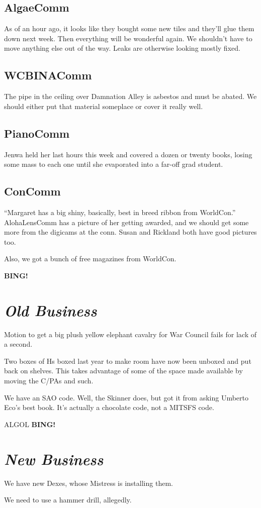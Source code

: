 \documentclass[10pt]{article}
\newcommand{\bing}{{\bf BING!} }
\newcommand{\goto}[1]{\bing \vskip 12pt \section*{{\em{#1}}}}
\begin{document}
\subsection*{AlgaeComm} As of an hour ago, it looks like they bought some new tiles
and they'll glue them down next week.  Then everything will be
wonderful again.  We shouldn't have to move anything else out of the
way.  Leaks are otherwise looking mostly fixed.

\subsection*{WCBINAComm} The pipe in the ceiling over Damnation Alley is asbestos
and must be abated.  We should either put that material someplace or
cover it really well.

\subsection*{PianoComm} Jenwa held her last hours this week and covered a
dozen or twenty books, losing some mass to each one until she
evaporated into a far-off grad student.

\subsection*{ConComm} ``Margaret has a big shiny, basically, best in breed ribbon
from WorldCon.''  AlohaLensComm has a picture of her getting awarded,
and we should get some more from the digicams at the conn.  Susan and
Rickland both have good pictures too.

Also, we got a bunch of free magazines from WorldCon.

\goto{Old Business}

Motion to get a big plush yellow elephant cavalry for War Council
fails for lack of a second.

Two boxes of Hs boxed last year to make room have now been unboxed and
put back on shelves.  This takes advantage of some of the space made
available by moving the C/PAs and such.

We have an SAO code.  Well, the Skinner does, but got it from asking
Umberto Eco's best book.  It's actually a chocolate code, not a MITSFS
code.

ALGOL
\goto{New Business}

We have new Dexes, whose Mistress is installing them.

We need to use a hammer drill, allegedly.
\end{document}
